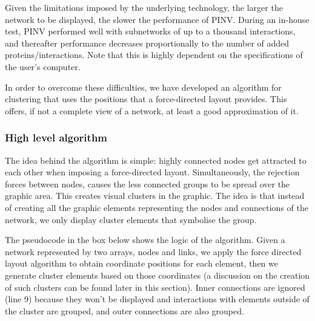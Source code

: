 Given the limitations imposed by the underlying technology, the larger the network to be displayed, the slower the performance of PINV. During an in-house test, PINV performed well with subnetworks of up to a thousand interactions, and thereafter performance decreases proportionally to the number of added proteins/interactions. Note that this is highly dependent on the specifications of the user's computer. 

In order to overcome these difficulties, we have developed an algorithm for clustering that uses the positions that a force-directed layout provides. This offers, if not a complete view of a network, at least a good approximation of it.

\subsubsection{High level algorithm}
The idea behind the algorithm is simple: highly connected nodes get attracted to each other when imposing a force-directed layout. Simultaneously, the rejection forces between nodes, causes the less connected groups to be spread over the graphic area. This creates visual clusters in the graphic. The idea is that instead of creating all the graphic elements representing the nodes and connections of the network, we only display cluster elements that symbolise the group.

The pseudocode in the box below shows the logic of the algorithm. Given a network represented by two arrays, nodes and links, we apply the force directed layout algorithm to obtain coordinate positions for each element, then we generate cluster elements based on those coordinates (a discussion on the creation of such clusters can be found later in this section). Inner connections are ignored (line 9) because they won't be displayed and interactions with elements outside of the cluster are grouped,  and outer connections are also grouped.

